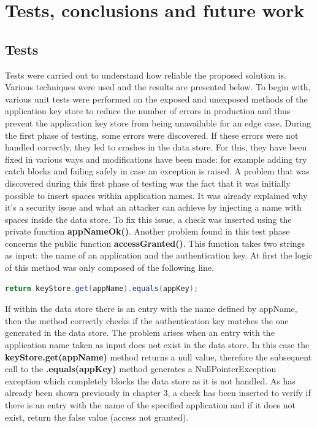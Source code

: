 \chapter{Tests, conclusions and future work}

\section{Tests}
Tests were carried out to understand how reliable the proposed solution is. Various techniques were used and the results are presented below. To begin with, various unit tests were performed on the exposed and unexposed methods of the application key store to reduce the number of errors in production and thus prevent the application key store from being unavailable for an edge case. During the first phase of testing, some errors were discovered. If these errors were not handled correctly, they led to crashes in the data store. For this, they have been fixed in various ways and modifications have been made: for example adding try catch blocks and failing safely in case an exception is raised. A problem that was discovered during this first phase of testing was the fact that it was initially possible to insert spaces within application names. It was already explained why it's a security issue and what an attacker can achieve by injecting a name with spaces inside the data store. To fix this issue, a check was inserted using the private function \textbf{appNameOk()}. Another problem found in this test phase concerns the public function \textbf{accessGranted()}. This function takes two strings as input: the name of an application and the authentication key. At first the logic of this method was only composed of the following line.
\begin{lstlisting}[language=java]
return keyStore.get(appName).equals(appKey);
\end{lstlisting}
If within the data store there is an entry with the name defined by appName, then the method correctly checks if the authentication key matches the one generated in the data store. The problem arises when an entry with the application name taken as input does not exist in the data store. In this case the \textbf{keyStore.get(appName)} method returns a null value, therefore the subsequent call to the \textbf{.equals(appKey)} method generates a NullPointerException exception which completely blocks the data store as it is not handled. As has already been shown previously in chapter 3, a check has been inserted to verify if there is an entry with the name of the specified application and if it does not exist, return the false value (access not granted). 

